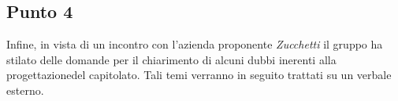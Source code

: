     \subsection{Punto 4}
        Infine, in vista di un incontro con l'azienda proponente \textit{Zucchetti} il gruppo ha stilato delle domande per il chiarimento di alcuni dubbi inerenti alla progettazione\glosp del capitolato\glo. Tali temi verranno in seguito trattati su un verbale esterno.